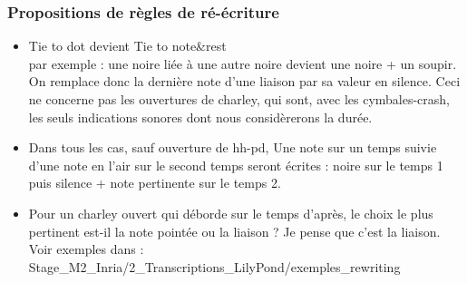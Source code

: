 \subsubsection{Propositions de règles de ré-écriture}
\begin{itemize}
\item 
Tie to dot devient Tie to note\&rest\\
par exemple : une noire liée à une autre noire devient une noire + un soupir.\\
On remplace donc la dernière note d’une liaison par sa valeur en silence.
Ceci ne concerne pas les ouvertures de charley, qui sont, avec les cymbales-crash, les seuls indications sonores dont nous considèrerons la durée.
\item 
Dans tous les cas, sauf ouverture de hh-pd, Une note sur un temps suivie d’une note en l’air sur le second temps seront écrites : noire sur le temps 1 puis silence + note pertinente sur le temps 2.
\item
Pour un charley ouvert qui déborde sur le temps d’après, le choix le plus pertinent est-il la note pointée ou la liaison ? Je pense que c’est la liaison.
Voir exemples dans :
Stage\_M2\_Inria/2\_Transcriptions\_LilyPond/exemples\_rewriting
\end{itemize}
